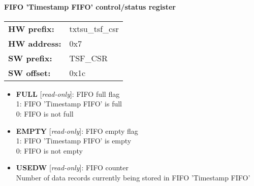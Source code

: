 \paragraph*{FIFO 'Timestamp FIFO' control/status register}\vspace{12pt}

\begin{tabular}{l l }
{\bf HW prefix:}  & txtsu\_tsf\_csr\\
{\bf HW address:}  & 0x7\\
{\bf SW prefix:}  & TSF\_CSR\\
{\bf SW offset:}  & 0x1c\\
\end{tabular}


\vspace{12pt}
\noindent
{}

\begin{itemize}
\item \begin{small}
{\bf 
FULL
} [\emph{read-only}]: FIFO full flag
\\
1: FIFO 'Timestamp FIFO' is full\\0: FIFO is not full
\end{small}
\item \begin{small}
{\bf 
EMPTY
} [\emph{read-only}]: FIFO empty flag
\\
1: FIFO 'Timestamp FIFO' is empty\\0: FIFO is not empty
\end{small}
\item \begin{small}
{\bf 
USEDW
} [\emph{read-only}]: FIFO counter
\\
Number of data records currently being stored in FIFO 'Timestamp FIFO'
\end{small}
\end{itemize}


